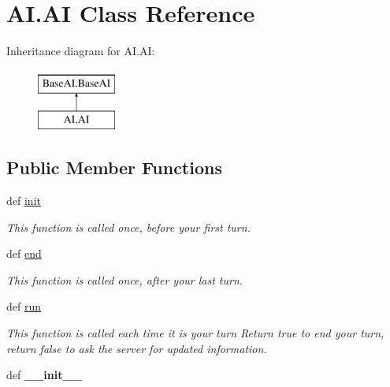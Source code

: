 \hypertarget{classAI_1_1AI}{\section{\-A\-I.\-A\-I \-Class \-Reference}
\label{classAI_1_1AI}
}
\-Inheritance diagram for \-A\-I.\-A\-I\-:\begin{figure}[H]
\begin{center}
\leavevmode
\includegraphics[height=2.000000cm]{classAI_1_1AI}
\end{center}
\end{figure}
\subsection*{\-Public \-Member \-Functions}
\begin{DoxyCompactItemize}
\item 
\hypertarget{classAI_1_1AI_a8bb330b74f9b23a5a99b19c12bb5777a}{def \hyperlink{classAI_1_1AI_a8bb330b74f9b23a5a99b19c12bb5777a}{init}}\label{classAI_1_1AI_a8bb330b74f9b23a5a99b19c12bb5777a}

\begin{DoxyCompactList}\small\item\em \-This function is called once, before your first turn. \end{DoxyCompactList}\item 
\hypertarget{classAI_1_1AI_a159aa88ec3715d7897fa16626c028f56}{def \hyperlink{classAI_1_1AI_a159aa88ec3715d7897fa16626c028f56}{end}}\label{classAI_1_1AI_a159aa88ec3715d7897fa16626c028f56}

\begin{DoxyCompactList}\small\item\em \-This function is called once, after your last turn. \end{DoxyCompactList}\item 
\hypertarget{classAI_1_1AI_a3ee9bbe0755a666e6c6ea4016488a6b0}{def \hyperlink{classAI_1_1AI_a3ee9bbe0755a666e6c6ea4016488a6b0}{run}}\label{classAI_1_1AI_a3ee9bbe0755a666e6c6ea4016488a6b0}

\begin{DoxyCompactList}\small\item\em \-This function is called each time it is your turn \-Return true to end your turn, return false to ask the server for updated information. \end{DoxyCompactList}\item 
\hypertarget{classAI_1_1AI_a7f3b078b9159657d003cedb868264852}{def {\bfseries \-\_\-\-\_\-init\-\_\-\-\_\-}}\label{classAI_1_1AI_a7f3b078b9159657d003cedb868264852}

\end{DoxyCompactItemize}
